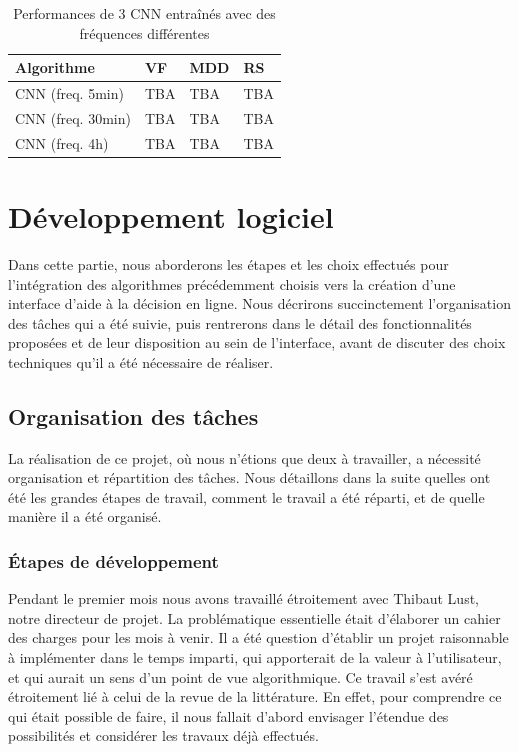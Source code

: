\documentclass[a4paper, 10pt]{article}
\begin{document}
\begin{center}
\begin{table}[!ht]
\begin{tabularx}{\textwidth}{YYYY}
\toprule
\textbf{Algorithme} & \textbf{VF} & \textbf{MDD} & \textbf{RS}\\
\midrule
CNN (freq. 5min)    & TBA & TBA &  TBA \\
CNN (freq. 30min)   & TBA & TBA &  TBA \\
CNN (freq. 4h)      & TBA & TBA &  TBA \\
\bottomrule
\end{tabularx}
\caption{Performances de 3 CNN entraînés avec des fréquences différentes}
\label{tab:cnn_compar}
\end{table}
\end{center}

\newpage
\section{Développement logiciel}
\label{sec:developpement}

Dans cette partie, nous aborderons les étapes et les choix effectués pour l'intégration des algorithmes précédemment choisis vers la création d'une interface d'aide à la décision en ligne. Nous décrirons succinctement l'organisation des tâches qui a été suivie, puis rentrerons dans le détail des fonctionnalités proposées et de leur disposition au sein de l'interface, avant de discuter des choix techniques qu'il a été nécessaire de réaliser.

\subsection{Organisation des tâches}
\label{sec:developpement_orga}

La réalisation de ce projet, où nous n'étions que deux à travailler, a nécessité organisation et répartition des tâches. Nous détaillons dans la suite quelles ont été les grandes étapes de travail, comment le travail a été réparti, et de quelle manière il a été organisé.

\subsubsection{Étapes de développement}
\label{sec:developpement_orga_etapes}

Pendant le premier mois nous avons travaillé étroitement avec Thibaut Lust, notre directeur de projet. La problématique essentielle était d’élaborer un cahier des charges pour les mois à venir. Il a été question d’établir un projet raisonnable à implémenter dans le temps imparti, qui apporterait de la valeur à l’utilisateur, et qui aurait un sens d’un point de vue algorithmique. Ce travail s’est avéré étroitement lié à celui de la revue de la littérature. En effet, pour comprendre ce qui était possible de faire, il nous fallait d’abord envisager l’étendue des possibilités et considérer les travaux déjà effectués.
\end{document}
